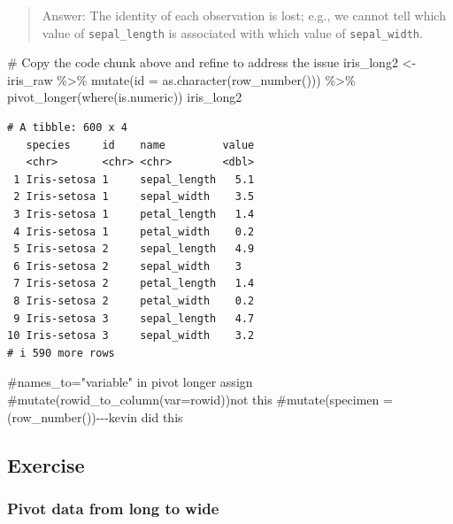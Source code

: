 \documentclass[
  letterpaper,
  DIV=11,
  numbers=noendperiod]{scrartcl}
\newenvironment{Shaded}{\begin{snugshade}}{\end{snugshade}}
\newcommand{\AttributeTok}[1]{\textcolor[rgb]{0.40,0.45,0.13}{#1}}
\newcommand{\CommentTok}[1]{\textcolor[rgb]{0.37,0.37,0.37}{#1}}
\newcommand{\FunctionTok}[1]{\textcolor[rgb]{0.28,0.35,0.67}{#1}}
\newcommand{\NormalTok}[1]{\textcolor[rgb]{0.00,0.23,0.31}{#1}}
\newcommand{\OtherTok}[1]{\textcolor[rgb]{0.00,0.23,0.31}{#1}}
\newcommand{\SpecialCharTok}[1]{\textcolor[rgb]{0.37,0.37,0.37}{#1}}
\begin{document}
\begin{quote}
Answer: The identity of each observation is lost; e.g., we cannot tell
which value of \texttt{sepal\_length} is associated with which value of
\texttt{sepal\_width}.
\end{quote}

\begin{Shaded}
\begin{Highlighting}[]
\CommentTok{\# Copy the code chunk above and refine to address the issue}
\NormalTok{iris\_long2  }\OtherTok{\textless{}{-}}\NormalTok{ iris\_raw  }\SpecialCharTok{\%\textgreater{}\%} 
  \FunctionTok{mutate}\NormalTok{(}\AttributeTok{id =} \FunctionTok{as.character}\NormalTok{(}\FunctionTok{row\_number}\NormalTok{())) }\SpecialCharTok{\%\textgreater{}\%} 
  \FunctionTok{pivot\_longer}\NormalTok{(}\FunctionTok{where}\NormalTok{(is.numeric))}
\NormalTok{iris\_long2}
\end{Highlighting}
\end{Shaded}

\begin{verbatim}
# A tibble: 600 x 4
   species     id    name         value
   <chr>       <chr> <chr>        <dbl>
 1 Iris-setosa 1     sepal_length   5.1
 2 Iris-setosa 1     sepal_width    3.5
 3 Iris-setosa 1     petal_length   1.4
 4 Iris-setosa 1     petal_width    0.2
 5 Iris-setosa 2     sepal_length   4.9
 6 Iris-setosa 2     sepal_width    3  
 7 Iris-setosa 2     petal_length   1.4
 8 Iris-setosa 2     petal_width    0.2
 9 Iris-setosa 3     sepal_length   4.7
10 Iris-setosa 3     sepal_width    3.2
# i 590 more rows
\end{verbatim}

\begin{Shaded}
\begin{Highlighting}[]
\CommentTok{\#names\_to="variable" in pivot longer assign}
\CommentTok{\#mutate(rowid\_to\_column(var=rowid))not this}
\CommentTok{\#mutate(specimen = (row\_number()){-}{-}{-}kevin did this}
\end{Highlighting}
\end{Shaded}

\subsection{Exercise}\label{exercise-5}

\subsubsection{Pivot data from long to
wide}\label{pivot-data-from-long-to-wide}
\end{document}
